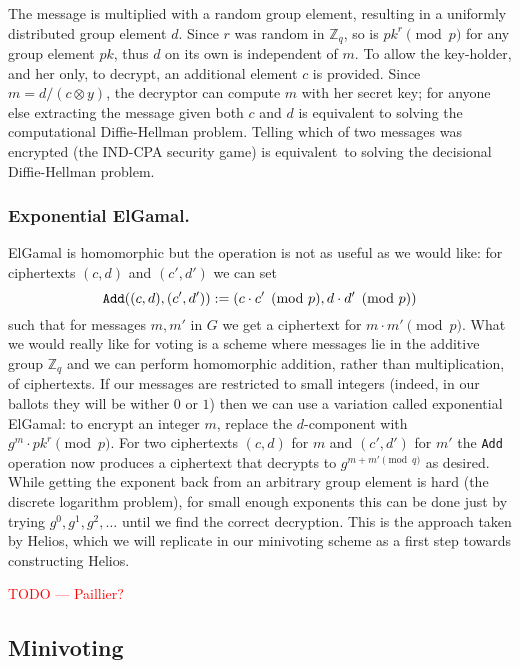 \documentclass[envcountsame]{llncs}
\newcommand{\alg}[1]{\textup{\texttt{#1}}}
\newenvironment{helios}{\begin{framed}
\vspace{-18pt}
\begin{wrapfigure}{l}{0.15\textwidth}
\vspace{-12pt}\quad{\Huge \Sun}
\end{wrapfigure}}{\end{framed}}
\begin{document}
The message is multiplied with a random group element, resulting in a uniformly
distributed group element $d$. Since $r$ was random in $\mathbb Z_q$, so is
$pk^r \pmod{p}$ for any group element $pk$, thus $d$ on its own is independent
of $m$. To allow the key-holder, and her only, to decrypt, an additional element
$c$ is provided. Since $m = d/(c \otimes y)$, the decryptor can compute $m$ with
her secret key; for anyone else extracting the message given both $c$ and $d$ is
equivalent to solving the computational Diffie-Hellman problem. Telling which of
two messages was encrypted (the IND-CPA security game) is
equivalent\footnotemark\ to solving the decisional Diffie-Hellman problem.

\begin{helios}
\subsubsection{Exponential ElGamal.}
ElGamal is homomorphic but the operation is not as useful as we would like:
for ciphertexts $(c, d)$ and $(c', d')$ we can set
\[
\alg{Add}((c, d), (c', d')) := (c \cdot c' \pmod{p}, d \cdot d' \pmod{p})
\]
such that for messages $m, m'$ in $G$ we get a ciphertext for $m \cdot m'
\pmod{p}$. What we would really like for voting is a scheme where messages lie
in the additive group $\mathbb Z_q$ and we can perform homomorphic addition,
rather than multiplication, of ciphertexts. If our messages are restricted to
small integers (indeed, in our ballots they will be wither $0$ or $1$) then we
can use a variation called exponential ElGamal: to encrypt an integer $m$,
replace the $d$-component with $g^m \cdot pk^r \pmod{p}$. For two ciphertexts
$(c, d)$ for $m$ and $(c', d')$ for $m'$ the \alg{Add} operation now produces a
ciphertext that decrypts to $g^{m + m' \pmod{q}}$ as desired. While getting the
exponent back from an arbitrary group element is hard (the discrete logarithm
problem), for small enough exponents this can be done just by trying $g^0, g^1,
g^2, \ldots$ until we find the correct decryption. This is the approach taken by
Helios, which we will replicate in our minivoting scheme as a first step towards
constructing Helios.
\end{helios}

\textcolor{red}{TODO --- Paillier?}

\subsection{Minivoting}
\end{document}
